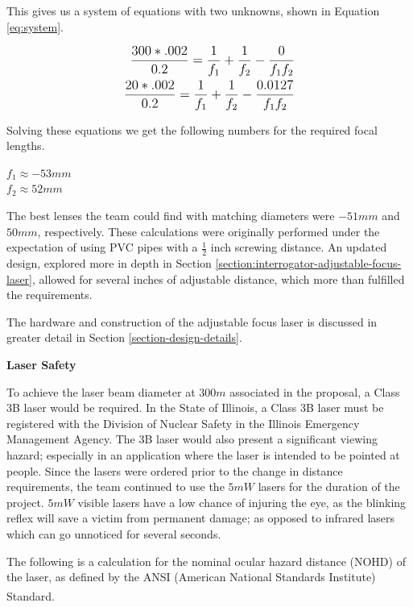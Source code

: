 \documentclass[letterpaper,10pt]{article}
\begin{document}
\begin{spacing}{1.15}
This gives us a system of equations with two unknowns, shown in Equation \ref{eq:system}. 

 \begin{align} \label{eq:system} \large \begin{split}
\frac{300*.002}{0.2} =  \frac{1}{f_1} + \frac{1}{f_2} - \frac{0}{f_1 f_2}
 \\
 \frac{20*.002}{0.2} =  \frac{1}{f_1} + \frac{1}{f_2} - \frac{0.0127}{f_1 f_2}
 \end{split}
 \end{align}

Solving these equations we get the following numbers for the required focal lengths.
\begin{center}
	\large
	$f_1 \approx -53mm$ \\
	$f_2 \approx  52mm$
\end{center}

The best lenses the team could find with matching diameters were $-51mm$ and $50mm$, respectively. These calculations were originally performed under the expectation of using PVC pipes with a $\frac{1}{2}$ inch screwing distance. An updated design, explored more in depth in Section \ref{section:interrogator-adjustable-focus-laser}, allowed for several inches of adjustable distance, which more than fulfilled the requirements. 

The hardware and construction of the adjustable focus laser is discussed in greater detail in Section \ref{section-design-details}. 

\hspace{5mm}\textbf{Laser Safety}

 To achieve the laser beam diameter at $300 m$ associated in the proposal, a Class 3B laser would be required. In the State of Illinois, a Class 3B laser must be registered with the Division of Nuclear Safety in the Illinois Emergency Management Agency. The 3B laser would also present a significant viewing hazard; especially in an application where the laser is intended to be pointed at people. Since the lasers were ordered prior to the change in distance requirements, the team continued to use the $5mW$ lasers for the duration of the project. $5mW$ visible lasers have a low chance of injuring the eye, as the blinking reflex will save a victim from permanent damage; as opposed to infrared lasers which can go unnoticed for several seconds. 
 
 The following is a calculation for the nominal ocular hazard distance (NOHD) of the laser, as defined by the ANSI (American National Standards Institute) Standard\textsuperscript{\cite{ANSI}}.
 

\end{spacing}
\end{document}
